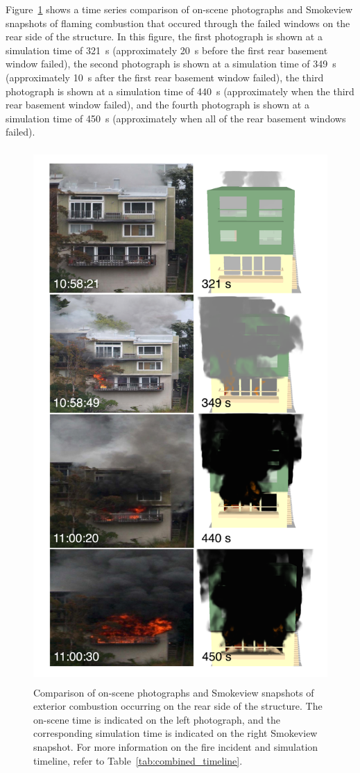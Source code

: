 \documentclass[12pt,oneside]{book}
\begin{document}
Figure~\ref{fig:timeline_comparison} shows a time series comparison of on-scene photographs and Smokeview snapshots of flaming combustion that occured through the failed windows on the rear side of the structure. In this figure, the first photograph is shown at a simulation time of 321~s (approximately 20~s before the first rear basement window failed), the second photograph is shown at a simulation time of 349~s (approximately 10~s after the first rear basement window failed), the third photograph is shown at a simulation time of 440~s (approximately when the third rear basement window failed), and the fourth photograph is shown at a simulation time of 450~s (approximately when all of the rear basement windows failed).

\begin{figure}[!ht]
\includegraphics[height=8.0in]{../Figures/Timeline_Comparison}
\caption{Comparison of on-scene photographs and Smokeview snapshots of exterior combustion occurring on the rear side of the structure. The on-scene time is indicated on the left photograph, and the corresponding simulation time is indicated on the right Smokeview snapshot. For more information on the fire incident and simulation timeline, refer to Table~\ref{tab:combined_timeline}.}
\label{fig:timeline_comparison}
\end{figure}
\end{document}
